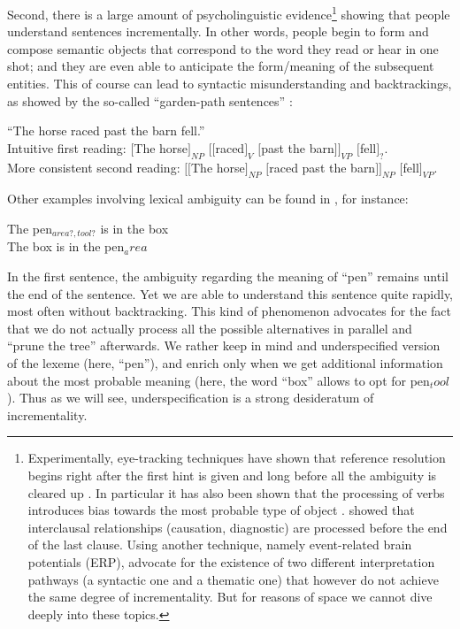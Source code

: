 \documentclass[11pt]{article}
\begin{document}
				Second, there is a large amount of psycholinguistic evidence\footnote{Experimentally, eye-tracking techniques have shown that reference resolution begins right after the first hint is given and long before all the ambiguity is cleared up \cite{tanenhaus1996}. In particular it has also been shown that the processing of verbs introduces bias towards the most probable type of object \cite{altmann1999}. \cite{traxler1997} showed that interclausal relationships (causation, diagnostic) are processed before the end of the last clause. Using another technique, namely event-related brain potentials (ERP), \cite{schlesewsky2004} advocate for the existence of two different interpretation pathways (a syntactic one and a thematic one) that however do not achieve the same degree of incrementality. But for reasons of space we cannot dive deeply into these topics.} showing that people understand sentences incrementally. In other words, people begin to form and compose semantic objects that correspond to the word they read or hear in one shot; and they are even able to anticipate the form/meaning of the subsequent entities. This of course can lead to syntactic misunderstanding and backtrackings, as showed by the so-called ``garden-path sentences'' \cite{sag2015}:
				\begin{center}
					``The horse raced past the barn fell.'' \cite{bever2013}\vspace{1mm}\\
					Intuitive first reading: $[$The horse$]_{NP}$ $[ [$raced$]_V$ $[$past the barn$] ]_{VP}$ $[$fell$]_?$. \vspace{1mm}\\
					More consistent second reading: $[[$The horse$]_{NP}$ $[$raced past the barn$]]_{NP}$ $[$fell$]_{VP}$.\\
				\end{center}
				Other examples involving lexical ambiguity can be found in \cite{sag2015}, for instance:
				\begin{center}
					The pen$_{area?, tool?}$ is in the box \\
					The box is in the pen$_area$
				\end{center}
				In the first sentence, the ambiguity regarding the meaning of ``pen'' remains until the end of the sentence. Yet we are able to understand this sentence quite rapidly, most often without backtracking. This kind of phenomenon advocates for the fact that we do not actually process all the possible alternatives in parallel and ``prune the tree'' afterwards. We rather keep in mind and underspecified version of the lexeme (here, ``pen''), and enrich only when we get additional information about the most probable meaning (here, the word ``box'' allows to opt for pen$_tool$). Thus as we will see, underspecification is a strong desideratum of incrementality.\\
				
\end{document}
